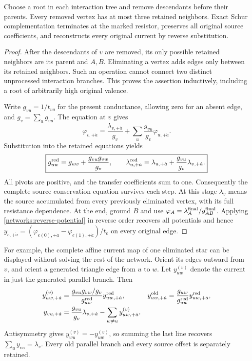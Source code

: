 \begin{proposition}
\label{networks:kron-theorem}
Choose a root in each interaction tree and remove descendants before
their parents.  Every removed vertex has at most three retained
neighbors.  Exact Schur complementation terminates at the marked resistor,
preserves all original source coefficients, and reconstructs every
original current by reverse substitution.
\end{proposition}
\begin{proof}
After the descendants of $v$ are removed, its only possible retained
neighbors are its parent and $A,B$.  Eliminating a vertex adds edges only
between its retained neighbors.  Such an operation cannot connect two
distinct unprocessed interaction branches.  This proves the assertion
inductively, including a root of arbitrarily high original valence.

Write $g_{vu}=1/t_{vu}$ for the present conductance, allowing zero for an
absent edge, and $g_v=\sum_u g_{vu}$.  The equation at $v$ gives
\begin{equation}
 \varphi_{v,+\dot a}
 =\frac{\lambda_{v,+\dot a}}{g_v}
       +\sum_u\frac{g_{vu}}{g_v}\varphi_{u,+\dot a}.
 \label{networks:reverse-potential}
\end{equation}
Substitution into the retained equations yields
\begin{equation}
 \boxed{g^{\rm red}_{uw}=g_{uw}+\frac{g_{vu}g_{vw}}{g_v},\qquad
 \lambda^{\rm red}_{u,+\dot a}
       =\lambda_{u,+\dot a}+\frac{g_{vu}}{g_v}\lambda_{v,+\dot a}.}
 \label{networks:sourced-schur}
\end{equation}
All pivots are positive, and the transfer coefficients sum to one.
Consequently the complete source conservation equation survives each
step.  At this stage $\lambda_v$ means the source accumulated from every
previously eliminated vertex, with its full resistance dependence.
At the end, ground $B$ and use
$\varphi_A=\lambda_A^{\rm final}/g_{AB}^{\rm final}$.
Applying \eqref{networks:reverse-potential} in reverse order recovers all
potentials and hence $y_{e,+\dot a}=(\varphi_{e(0),+\dot a}
-\varphi_{e(1),+\dot a})/t_e$ on every original edge.
\end{proof}

For example, the complete affine current map of one eliminated star can
be displayed without solving the rest of the network.  Orient its edges
outward from $v$, and orient a generated triangle edge from $u$ to $w$.
Let $y^{(v)}_{uw}$ denote the current in just the generated parallel branch.
Then
\begin{align}
 y^{(v)}_{uw,+\dot a}
 &=\frac{g_{vu}g_{vw}/g_v}{g^{\rm red}_{uw}}y^{\rm red}_{uw,+\dot a},
 &y^{\rm old}_{uw,+\dot a}
 &=\frac{g_{uw}}{g^{\rm red}_{uw}}y^{\rm red}_{uw,+\dot a},\\
 y_{vu,+\dot a}
 &=\frac{g_{vu}}{g_v}\lambda_{v,+\dot a}
       -\sum_{w\ne u}y^{(v)}_{uw,+\dot a}.
 \label{networks:full-star-current}
\end{align}
Antisymmetry gives $y^{(v)}_{wu}=-y^{(v)}_{uw}$, so summing the last line
recovers $\sum_u y_{vu}=\lambda_v$.  Every old parallel branch and every
source offset is separately retained.

